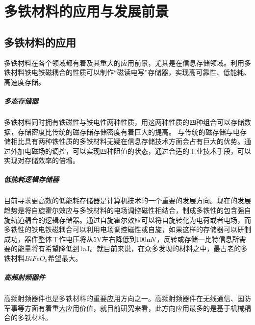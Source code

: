 \chapter{多铁材料的应用与发展前景}

\section{多铁材料的应用}
多铁材料在各个领域都有着及其重大的应用前景，尤其是在信息存储领域。利用多铁材料铁电铁磁耦合的性质可以制作“磁读电写”存储器，实现高可靠性、低能耗、高速度存储。

    

    
    
\paragraph{多态存储器}
多铁材料同时拥有铁磁性与铁电性两种性质，用这两种性质的四种组合可以存储数据，存储密度比传统的磁存储存储密度有着巨大的提高。
与传统的磁存储与电存储相比具有两种铁性质的多铁材料无疑在信息存储技术方面会占有巨大的优势。通过外加电磁场的调控，可以实现四种阻值的状态，通过合适的工业技术手段，可以实现对存储效率的倍增。

\paragraph{低能耗逻辑存储器}
目前寻求更高效的低能耗存储器是计算机技术的一个重要的发展方向。现在的发展趋势是将自旋霍尔效应与多铁材料的电场调控磁性相结合，制成多铁性的包含强自旋轨道耦合的逻辑存储器。通过自旋霍尔效应可以将自旋转化为电荷或者电场，而多铁性的铁电铁磁耦合可以利用电场调控磁性或自旋，如果这样的存储器可以研制成功，器件整体工作电压将从5V左右降低到100mV，反转或存储一比特信息所需要的能量将有希望降低到1aJ。就目前来说，在众多发现的材料之中，最古老的多铁材料$BiFeO_{3}$希望最大。




\paragraph{高频射频器件}
高频射频器件也是多铁材料的重要应用方向之一。高频射频器件在无线通信、国防军事等方面有着重大应用价值，就目前研究来看，此方向应用最多的是基于机械耦合的多铁材料。

